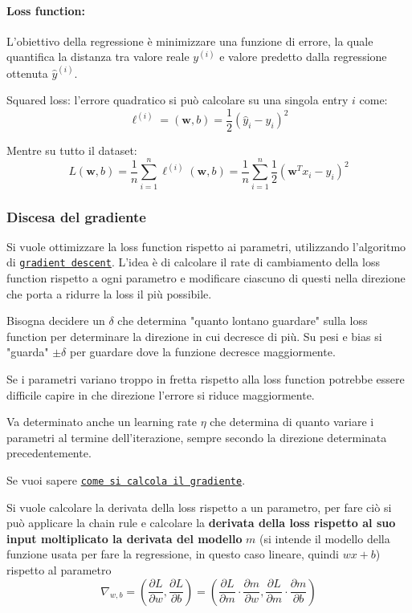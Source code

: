 \paragraph{Loss function:} L'obiettivo della regressione è minimizzare una funzione di errore, la quale quantifica la distanza tra valore reale $y^{(i)}$ e valore predetto dalla regressione ottenuta $\hat y^{(i)}$.

Squared loss: l'errore quadratico si può calcolare su una singola entry $i$ come:
$$ \ell^{(i)} = (\bm w, b) = \frac{1}{2}  \left(\hat y_i - y_i\right)^2 $$

Mentre su tutto il dataset:
$$ L (\bm w, b) = \frac{1}{n} \sum_{i=1}^{n} \ell^{(i)} (\bm w, b) = \frac{1}{n} \sum_{i=1}^{n} \frac{1}{2} \left(\bm w^T x_i - y_i \right)^2 $$


\subsubsection{Discesa del gradiente}

Si vuole ottimizzare la loss function rispetto ai parametri, utilizzando l'algoritmo di \href{https://it.wikipedia.org/wiki/Discesa_del_gradiente}{\texttt{gradient descent}}. L'idea è di calcolare il rate di cambiamento della loss function rispetto a ogni parametro e modificare ciascuno di questi nella direzione che porta a ridurre la loss il più possibile.

Bisogna decidere un $\delta$ che determina "quanto lontano guardare" sulla loss function per determinare la direzione in cui decresce di più. Su pesi e bias si "guarda" $\pm \delta$ per guardare dove la funzione decresce maggiormente.

Se i parametri variano troppo in fretta rispetto alla loss function potrebbe essere difficile capire in che direzione l'errore si riduce maggiormente.

Va determinato anche un learning rate $\eta$ che determina di quanto variare i parametri al termine dell'iterazione, sempre secondo la direzione determinata precedentemente.

Se vuoi sapere \href{https://it.wikipedia.org/wiki/Gradiente}{\texttt{come si calcola il gradiente}}.

Si vuole calcolare la derivata della loss rispetto a un parametro, per fare ciò si può applicare la chain rule e calcolare la \textbf{derivata della loss rispetto al suo input moltiplicato la derivata del modello} $m$ (si intende il modello della funzione usata per fare la regressione, in questo caso lineare, quindi $wx + b$) rispetto al parametro
$$ \nabla_{w,b} = \left( \frac{\partial L}{\partial w}, \frac{\partial L}{\partial b}\right) = \left(\frac{\partial L}{\partial m} \cdot \frac{\partial m}{\partial w}, \frac{\partial L}{\partial m} \cdot \frac{\partial m}{\partial b}\right) $$

